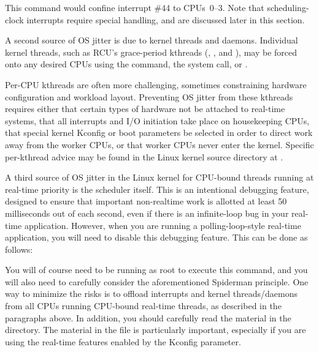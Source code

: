 This command would confine interrupt \#44 to CPUs~0--3.
Note that scheduling-clock interrupts require special handling, and are
discussed later in this section.

A second source of OS jitter is due to kernel threads and daemons.
Individual kernel threads, such as RCU's grace-period kthreads
(, , and ), may be forced
onto any desired CPUs using the  command, the
 system call, or .

Per-CPU kthreads are often more challenging, sometimes constraining
hardware configuration and workload layout.
Preventing OS jitter from these kthreads requires either that certain
types of hardware
not be attached to real-time systems, that all interrupts and I/O
initiation take place on housekeeping CPUs, that special kernel
Kconfig or boot parameters be selected in order to direct work away from
the worker CPUs, or that worker CPUs never enter the kernel.
Specific per-kthread advice may be found in the Linux kernel source
 directory at
.

A third source of OS jitter in the Linux kernel for CPU-bound threads
running at real-time priority is the scheduler itself.
This is an intentional debugging feature, designed to ensure that
important non-realtime work is allotted at least 50 milliseconds
out of each second, even if there is an infinite-loop bug in
your real-time application.
However, when you are running a polling-loop-style real-time application,
you will need to disable this debugging feature.
This can be done as follows:


You will of course need to be running as root to execute this command,
and you will also need to carefully consider the aforementioned Spiderman
principle.
One way to minimize the risks is to offload interrupts and
kernel threads/daemons from all CPUs running CPU-bound real-time
threads, as described in the paragraphs above.
In addition, you should carefully read the material in the
 directory.
The material in the  file is particularly
important, especially if you are using the  real-time features
enabled by the  Kconfig parameter.

